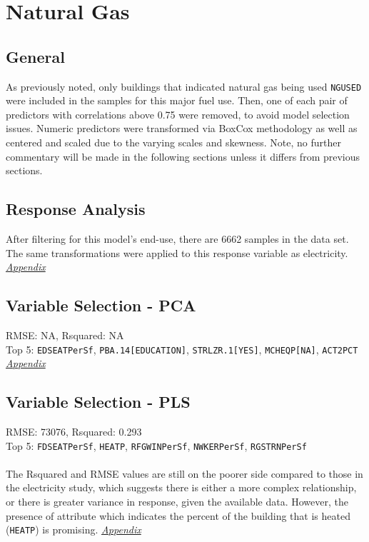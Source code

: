 \section{Natural Gas}
\label{sec:natural_gas}

\subsection{General}
As previously noted, only buildings that indicated natural gas being used \lstinline{NGUSED} were included in the samples for this major fuel use.  Then, one of each pair of predictors with correlations above 0.75 were removed, to avoid model selection issues. Numeric predictors were transformed via BoxCox methodology as well as centered and scaled due to the varying scales and skewness.  Note, no further commentary will be made in the following sections unless it differs from previous sections.

\subsection{Response Analysis}

After filtering for this model's end-use, there are 6662 samples in the data set.  The same transformations were applied to this response variable as electricity. \textit{\hyperref[appendix:natural_gas:response]{Appendix}}

\subsection{Variable Selection - PCA}
RMSE: NA, Rsquared: NA\\
Top 5: \lstinline{EDSEATPerSf}, \lstinline{PBA.14[EDUCATION]}, \lstinline{STRLZR.1[YES]}, \lstinline{MCHEQP[NA]}, \lstinline{ACT2PCT}  \textit{\hyperref[appendix:natural_gas:pca]{Appendix}}

\subsection{Variable Selection - PLS}
RMSE: 73076, Rsquared: 0.293\\
Top 5: \lstinline{FDSEATPerSf}, \lstinline{HEATP}, \lstinline{RFGWINPerSf}, \lstinline{NWKERPerSf}, \lstinline{RGSTRNPerSf}\\
\\[0.1in]
The Rsquared and RMSE values are still on the poorer side compared to those in the electricity study, which suggests there is either a more complex relationship, or there is greater variance in response, given the available data. However, the presence of attribute which indicates the percent of the building that is heated (\lstinline{HEATP}) is promising.   \textit{\hyperref[appendix:natural_gas:pls]{Appendix}}

